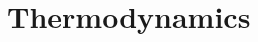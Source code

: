 \hypertarget{group___e_g_x_phys-_thermodynamics}{}\section{Thermodynamics}
\label{group___e_g_x_phys-_thermodynamics}
